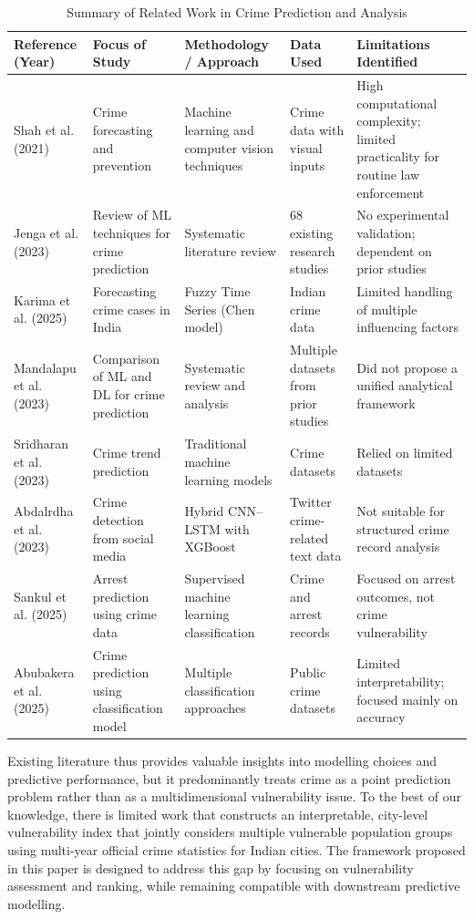 \documentclass[conference]{IEEEtran}
\begin{document}
\begin{table}[htbp]
\caption{Summary of Related Work in Crime Prediction and Analysis}
\label{tab:litreview}
\centering
\small
\begin{tabular}{p{2.2cm} p{2.7cm} p{4.0cm} p{3.0cm} p{4.0cm}}
\toprule
\textbf{Reference (Year)} & \textbf{Focus of Study} & \textbf{Methodology / Approach} & \textbf{Data Used} & \textbf{Limitations Identified} \\
\midrule
Shah et al. (2021) & Crime forecasting and prevention & Machine learning and computer vision techniques & Crime data with visual inputs & High computational complexity; limited practicality for routine law enforcement \\
Jenga et al. (2023) & Review of ML techniques for crime prediction & Systematic literature review & 68 existing research studies & No experimental validation; dependent on prior studies \\
Karima et al. (2025) & Forecasting crime cases in India & Fuzzy Time Series (Chen model) & Indian crime data & Limited handling of multiple influencing factors \\
Mandalapu et al. (2023) & Comparison of ML and DL for crime prediction & Systematic review and analysis & Multiple datasets from prior studies & Did not propose a unified analytical framework \\
Sridharan et al. (2023) & Crime trend prediction & Traditional machine learning models & Crime datasets & Relied on limited datasets \\
Abdalrdha et al. (2023) & Crime detection from social media & Hybrid CNN--LSTM with XGBoost & Twitter crime-related text data & Not suitable for structured crime record analysis \\
Sankul et al. (2025) & Arrest prediction using crime data & Supervised machine learning classification & Crime and arrest records & Focused on arrest outcomes, not crime vulnerability \\
Abubakera et al. (2025) & Crime prediction using classification model & Multiple classification approaches & Public crime datasets & Limited interpretability; focused mainly on accuracy \\
\bottomrule
\end{tabular}
\end{table}

Existing literature thus provides valuable insights into modelling choices and predictive performance, but it predominantly treats crime as a point prediction problem rather than as a multidimensional vulnerability issue. To the best of our knowledge, there is limited work that constructs an interpretable, city-level vulnerability index that jointly considers multiple vulnerable population groups using multi-year official crime statistics for Indian cities. The framework proposed in this paper is designed to address this gap by focusing on vulnerability assessment and ranking, while remaining compatible with downstream predictive modelling.
\end{document}
